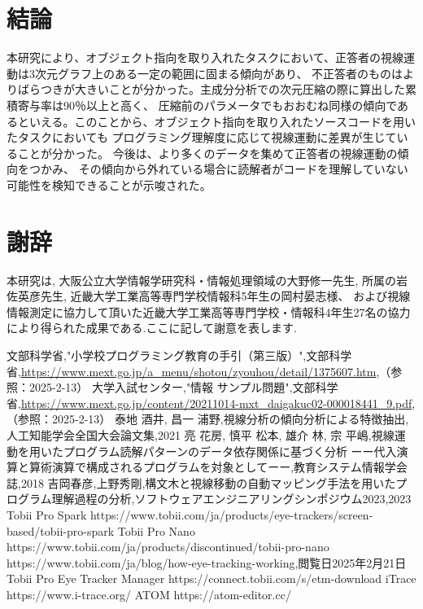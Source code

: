 \documentclass[paper=a4paper,fontsize=11pt]{jlreq}
\begin{document}
\part{結論}
本研究により、オブジェクト指向を取り入れたタスクにおいて、正答者の視線運動は3次元グラフ上のある一定の範囲に固まる傾向があり、
不正答者のものはよりばらつきが大きいことが分かった。主成分分析での次元圧縮の際に算出した累積寄与率は90％以上と高く、
圧縮前のパラメータでもおおむね同様の傾向であるといえる。このことから、オブジェクト指向を取り入れたソースコードを用いたタスクにおいても
プログラミング理解度に応じて視線運動に差異が生じていることが分かった。
今後は、より多くのデータを集めて正答者の視線運動の傾向をつかみ、
その傾向から外れている場合に読解者がコードを理解していない可能性を検知できることが示唆された。

\pagebreak

\part*{謝辞}
本研究は,
大阪公立大学情報学研究科・情報処理領域の大野修一先生,
所属の岩佐英彦先生,
近畿大学工業高等専門学校情報科5年生の岡村晏志様、
および視線情報測定に協力して頂いた近畿大学工業高等専門学校・情報科4年生27名の協力により得られた成果である.ここに記して謝意を表します.

\pagebreak

\begin{thebibliography}{99}
   文部科学省,"小学校プログラミング教育の手引（第三版）",文部科学省,\url{https://www.mext.go.jp/a_menu/shotou/zyouhou/detail/1375607.htm},（参照：2025-2-13）
   大学入試センター,"情報 サンプル問題",文部科学省,\url{https://www.mext.go.jp/content/20211014-mxt_daigakuc02-000018441_9.pdf},（参照：2025-2-13）
   泰地 酒井, 昌一 浦野,視線分析の傾向分析による特徴抽出,人工知能学会全国大会論文集,2021
   亮 花房, 慎平 松本, 雄介 林, 宗 平嶋,視線運動を用いたプログラム読解パターンのデータ依存関係に基づく分析
  ーー代入演算と算術演算で構成されるプログラムを対象としてーー,教育システム情報学会誌,2018
   吉岡春彦,上野秀剛,構文木と視線移動の自動マッピング手法を用いたプログラム理解過程の分析,ソフトウェアエンジニアリングシンポジウム2023,2023
   Tobii Pro Spark https://www.tobii.com/ja/products/eye-trackers/screen-based/tobii-pro-spark
   Tobii Pro Nano https://www.tobii.com/ja/products/discontinued/tobii-pro-nano
   https://www.tobii.com/ja/blog/how-eye-tracking-working,閲覧日2025年2月21日
   Tobii Pro Eye Tracker Manager https://connect.tobii.com/s/etm-download
   iTrace https://www.i-trace.org/
   ATOM https://atom-editor.cc/
\end{thebibliography}
\end{document}
